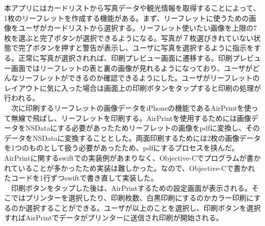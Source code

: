 本アプリにはカードリストから写真データや観光情報を取得することによって、1枚のリーフレットを作成する機能がある。まず、リーフレットに使うための画像をユーザがカードリストから選択する。リーフレット使いたい画像を上限の7枚を選ぶと完了ボタンが選択できるようになる。写真が７枚選びきれていない状態で完了ボタンを押すと警告が表示し、ユーザに写真を選択するように指示をする。正常に写真が選択されれば、印刷プレビュー画面に遷移する。印刷プレビュー画面ではリーフレットの表と裏の画像が見れるようになっており、ユーザがどんなリーフレットができるのか確認できるようにした。ユーザがリーフレットのレイアウトに気に入った場合は画面上の印刷ボタンをタップすると印刷の処理が行われる。\\
　次に印刷するリーフレットの画像データをiPhoneの機能であるAirPrintを使って無線で飛ばし、リーフレットを印刷する。AirPrintを使用するためには画像データをNSDataにする必要があったためリーフレットの画像をpdfに変換し、そのデータをNSDataに変換することとした。両面印刷するためには2枚の画像データを1つのものとして扱う必要があったため、pdfにするプロセスを挟んだ。AirPrintに関するswiftでの実装例があまりなく、Objective-Cでプログラムが書かれていることが多かったため実装は難しかった。なので、Objective-Cで書かれたコードを1行ずつswiftで書き直して実装した。\\
　印刷ボタンをタップした後は、AirPrintするための設定画面が表示される。そこではプリンターを選択したり、印刷枚数、白黒印刷にするのかカラー印刷にするのか選択することができる。ユーザが以上のことを選択し、印刷ボタンを選択すればAirPrintでデータがプリンターに送信され印刷が開始される。
